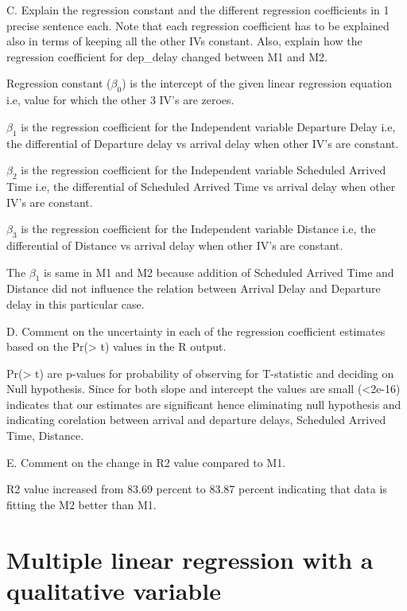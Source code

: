 \documentclass[
]{article}
\begin{document}
C. Explain the regression constant and the different regression
coefficients in 1 precise sentence each. Note that each regression
coefficient has to be explained also in terms of keeping all the other
IVs constant. Also, explain how the regression coefficient for
dep\_delay changed between M1 and M2.

Regression constant (\(\beta_{0}\)) is the intercept of the given linear
regression equation i.e, value for which the other 3 IV's are zeroes.

\(\beta_{1}\) is the regression coefficient for the Independent variable
Departure Delay i.e, the differential of Departure delay vs arrival
delay when other IV's are constant.

\(\beta_{2}\) is the regression coefficient for the Independent variable
Scheduled Arrived Time i.e, the differential of Scheduled Arrived Time
vs arrival delay when other IV's are constant.

\(\beta_{3}\) is the regression coefficient for the Independent variable
Distance i.e, the differential of Distance vs arrival delay when other
IV's are constant.

The \(\beta_{1}\) is same in M1 and M2 because addition of Scheduled
Arrived Time and Distance did not influence the relation between Arrival
Delay and Departure delay in this particular case.

D. Comment on the uncertainty in each of the regression coefficient
estimates based on the Pr(\textgreater{} \textbar t\textbar) values in
the R output.

Pr(\textgreater{} \textbar t\textbar) are p-values for probability of
observing for T-statistic and deciding on Null hypothesis. Since for
both slope and intercept the values are small (\textless2e-16) indicates
that our estimates are significant hence eliminating null hypothesis and
indicating corelation between arrival and departure delays, Scheduled
Arrived Time, Distance.

E. Comment on the change in R2 value compared to M1.

R2 value increased from 83.69 percent to 83.87 percent indicating that
data is fitting the M2 better than M1.

\hypertarget{multiple-linear-regression-with-a-qualitative-variable}{%
\section{Multiple linear regression with a qualitative
variable}\label{multiple-linear-regression-with-a-qualitative-variable}}
\end{document}
